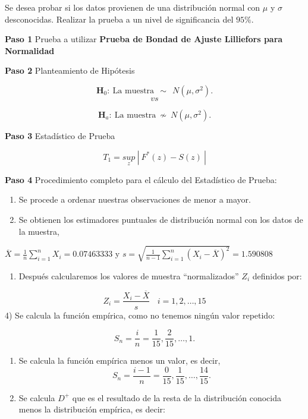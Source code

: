\documentclass[
  a4paper,
  oneside,
  openany]{book}
\providecommand{\tightlist}{%
  \setlength{\itemsep}{0pt}\setlength{\parskip}{0pt}}
\begin{document}
Se desea probar si los datos provienen de una distribución normal con \(\mu\) y \(\sigma\) desconocidas.
Realizar la prueba a un nivel de significancia del \(95\%.\)

\textbf{Paso 1} Prueba a utilizar \textbf{Prueba de Bondad de Ajuste Lilliefors para Normalidad}

\textbf{Paso 2} Planteamiento de Hipótesis

\[\textbf{H}_0: \ \mbox{La muestra} \ \ \sim \ \  N(\mu,\sigma^2).\]
\[vs\]

\[\textbf{H}_a: \ \mbox{La muestra}  \ \nsim \  N(\mu,\sigma^2).\]

\textbf{Paso 3} Estadístico de Prueba

\[T_{1}=\underset{z}{sup} \ | \ F^*(z)-S(z) \ |\]

\textbf{Paso 4} Procedimiento completo para el cálculo del Estadístico de Prueba:

\begin{enumerate}
\def\labelenumi{\arabic{enumi})}
\item
  Se procede a ordenar nuestras observaciones de menor a mayor.
\item
  Se obtienen los estimadores puntuales de distribución normal con los datos de la muestra,
\end{enumerate}

\(\overline{X}=\frac{1}{n}\sum_{i=1}^{n}X_{i}= 0.07463333\) y \(s=\sqrt{\frac{1}{n-1}\sum_{i=1}^{n}(X_{i}-\overline{X})^2}=1.590808\)

\begin{enumerate}
\def\labelenumi{\arabic{enumi})}
\setcounter{enumi}{2}
\tightlist
\item
  Después calcularemos los valores de muestra ``normalizados'' \(Z_{i}\) definidos por:
\end{enumerate}

\[Z_{i}=\frac{X_{i}-\overline{X}}{s} \ \ \ \ i=1,2,\ldots,15\]
4) Se calcula la función empírica, como no tenemos ningún valor repetido:

\[S_{n}= \frac{i}{n}=\frac{1}{15},\frac{2}{15}, \ldots, 1. \]

\begin{enumerate}
\def\labelenumi{\arabic{enumi})}
\setcounter{enumi}{4}
\item
  Se calcula la función empírica menos un valor, es decir,
  \[S_{n}= \frac{i-1}{n}=\frac{0}{15},\frac{1}{15}, \ldots, \frac{14}{15}.\]
\item
  Se calcula \(D^+\) que es el resultado de la resta de la distribución conocida menos la distribución empírica, es decir:
\end{enumerate}
\end{document}
